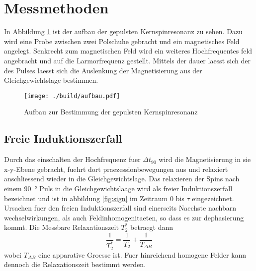 \section{Messmethoden}%
\label{sec:messmethoden}
In Abbildung \ref{fig:aufbau} ist der aufbau der gepulsten Kernspinresonanz zu
sehen. 
Dazu wird eine Probe zwischen zwei Polschuhe gebracht und ein magnetisches Feld
angelegt.
Senkrecht zum magnetischen Feld wird ein weiteres Hochfrequentes feld angebracht
und auf die Larmorfrequenz gestellt. 
Mittels der dauer laesst sich der des Pulses laesst sich die Auslenkung der
Magnetisierung aus der Gleichgewichtslage bestimmen. 
\begin{figure}[ht]
		\centering
		\texttt{[image: ./build/aufbau.pdf]}
		\caption{Aufbau zur Bestimmung der gepulsten Kernspinresonanz}
		\label{fig:aufbau}
\end{figure}
\subsection{Freie Induktionszerfall}%
\label{sub:freie_induktionszerfall}
Durch das einschalten der Hochfrequenz fuer $\Delta t_{90}$ wird die
Magnetisierung in sie x-y-Ebene gebracht, fuehrt dort praezessionbewegungen aus und relaxiert anschliessend wieder in
die Gleichgewichtslage. 
Das relaxieren der Spins nach einem \SI{90}{\degree} Puls in die
Gleichgewichtslaage wird als freier Induktionszerfall bezeichnet und ist in
abbildung \ref{fig:sign} im Zeitraum 0 bis $\tau$ eingezeichnet.
Ursachen fuer den freien Induktionszerfall sind einerseits Naechste nachbarn
wechselwirkungen, als auch Feldinhomogenitaeten, so dass es zur dephasierung
kommt.
Die Messbare Relaxationszeit $T_2^*$ betraegt dann
\begin{equation}
		\frac{1}{T_2^*} = \frac{1}{T_2} + \frac{1}{T_{\Delta B}}
\end{equation}
wobei $T_{\Delta B}$ eine apparative Groesse ist. 
Fuer hinreichend homogene Felder kann dennoch die Relaxationszeit bestimmt
werden. 
